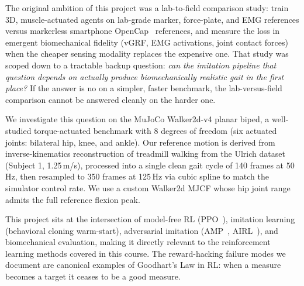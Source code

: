 \documentclass{article}
\begin{document}
The original ambition of this project was a lab-to-field comparison study: train 3D, muscle-actuated agents on lab-grade marker, force-plate, and EMG references versus markerless smartphone OpenCap~\cite{uhlrich2023opencap} references, and measure the loss in emergent biomechanical fidelity (vGRF, EMG activations, joint contact forces) when the cheaper sensing modality replaces the expensive one. That study was scoped down to a tractable backup question: \emph{can the imitation pipeline that question depends on actually produce biomechanically realistic gait in the first place?} If the answer is no on a simpler, faster benchmark, the lab-versus-field comparison cannot be answered cleanly on the harder one.

We investigate this question on the MuJoCo Walker2d-v4 planar biped, a well-studied torque-actuated benchmark with 8 degrees of freedom (six actuated joints: bilateral hip, knee, and ankle). Our reference motion is derived from inverse-kinematics reconstruction of treadmill walking from the Ulrich dataset (Subject 1, 1.25\,m/s), processed into a single clean gait cycle of 140 frames at 50\,Hz, then resampled to 350 frames at 125\,Hz via cubic spline to match the simulator control rate. We use a custom Walker2d MJCF whose hip joint range admits the full reference flexion peak.

This project sits at the intersection of model-free RL (PPO~\cite{schulman2017ppo}), imitation learning (behavioral cloning warm-start), adversarial imitation (AMP~\cite{escontrela2022amp}, AIRL~\cite{fu2018airl}), and biomechanical evaluation, making it directly relevant to the reinforcement learning methods covered in this course. The reward-hacking failure modes we document are canonical examples of Goodhart's Law in RL: when a measure becomes a target it ceases to be a good measure.
\end{document}
